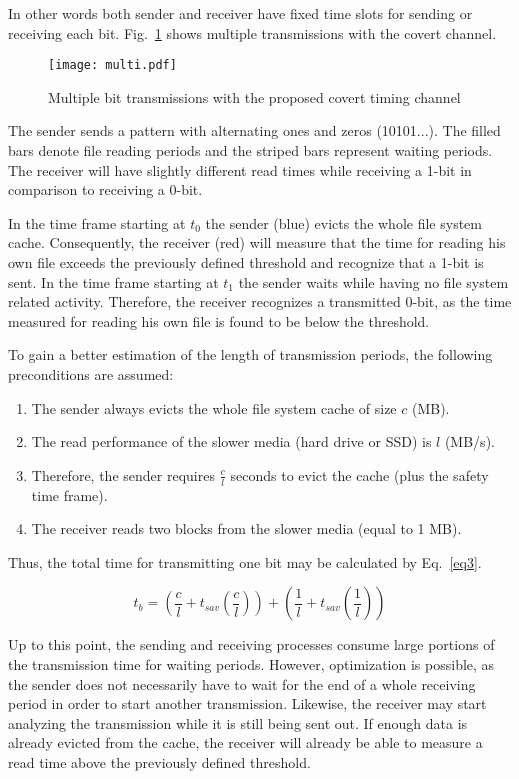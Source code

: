 \documentclass[runningheads,a4paper]{llncs}
\begin{document}
In other words both sender and receiver have fixed time slots for sending or receiving each bit.
Fig.~\ref{multi} shows multiple transmissions with the covert channel.
\begin{figure}[!ht]
\texttt{[image: multi.pdf]}
\caption{Multiple bit transmissions with the proposed covert timing channel}
\label{multi}
\end{figure}
The sender sends a pattern with alternating ones and zeros (10101...).
The filled bars denote file reading periods and the striped bars represent waiting periods.
The receiver will have slightly different read times while receiving a 1-bit in comparison to receiving a 0-bit.

In the time frame starting at $t_{0}$ the sender (blue) evicts the whole file system cache. 
Consequently, the receiver (red) will measure that the time for reading his own file exceeds the previously defined threshold and recognize that a 1-bit is sent. 
In the time frame starting at $t_{1}$ the sender waits while having no file system related activity. 
Therefore, the receiver recognizes a transmitted 0-bit, as the time measured for reading his own file is found to be below the threshold.

To gain a better estimation of the length of transmission periods, the following preconditions are assumed:

\begin{enumerate}
\item The sender always evicts the whole file system cache of size $c$ (MB). 
\item The read performance of the slower media (hard drive or SSD) is $l$ (MB/s). 
\item Therefore, the sender requires $\frac{c}{l}$ seconds to evict the cache (plus the safety time frame).
\item The receiver reads two blocks from the slower media (equal to 1 MB). 
\end{enumerate}

Thus, the total time for transmitting one bit may be calculated by Eq.~\ref{eq3}.

\begin{equation}\label{eq3}
t_{b}=\left(\frac{c}{l}+t_{sav}\left(\frac{c}{l}\right)\right)+\left(\frac{1}{l}+t_{sav}\left(\frac{1}{l}\right)\right)
\end{equation}

Up to this point, the sending and receiving processes consume large portions of the transmission time for waiting periods.
However, optimization is possible, as the sender does not necessarily have to wait for the end of a whole receiving period in order to start another transmission.
Likewise, the receiver may start analyzing the transmission while it is still being sent out.
If enough data is already evicted from the cache, the receiver will already be able to measure a read time above the previously defined threshold.
\end{document}

